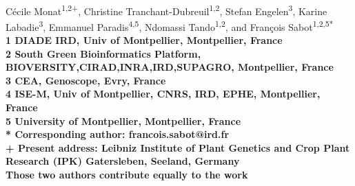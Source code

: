 \documentclass[10pt,letterpaper]{article}
\begin{document}
\vspace*{0.35in}

\begin{flushleft}
{\Large
\textbf{}
}
\newline
\\
Cécile Monat\textsuperscript{1,2{+}\textdagger},
Christine Tranchant-Dubreuil\textsuperscript{1,2\textdagger},
Stefan Engelen\textsuperscript{3},
Karine Labadie\textsuperscript{3},
Emmanuel Paradis\textsuperscript{4,5},
Ndomassi Tando\textsuperscript{1,2},
and François Sabot\textsuperscript{1,2,5*}
\\
\bigskip
\bf{1} DIADE IRD, Univ of Montpellier, Montpellier, France
\\
\bf{2} South Green Bioinformatics Platform, BIOVERSITY,CIRAD,INRA,IRD,SUPAGRO, Montpellier, France
\\
\bf{3} CEA, Genoscope, Evry, France
\\
\bf{4} ISE-M, Univ of Montpellier, CNRS, IRD, EPHE, Montpellier, France
\\
\bf{5} University of Montpellier, Montpellier, France
\\
\bigskip
* Corresponding author: francois.sabot@ird.fr\\
{+} Present address: Leibniz Institute of Plant Genetics and Crop Plant Research (IPK) Gatersleben, Seeland, Germany\\
\textdagger Those two authors contribute equally to the work\\
\end{flushleft}
\end{document}
